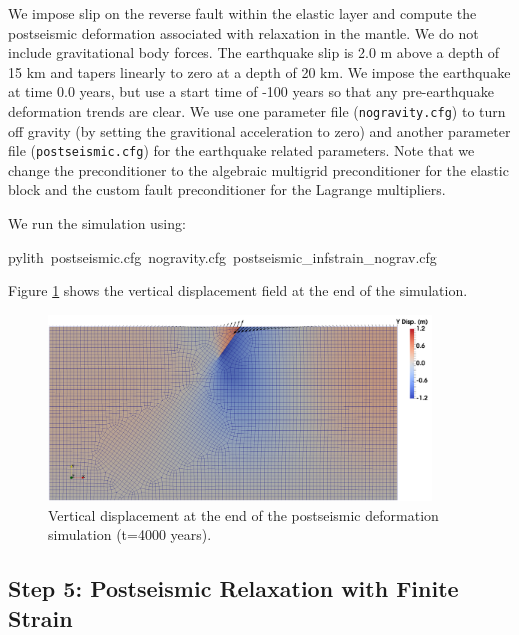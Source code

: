 We impose slip on the reverse fault within the elastic layer and compute
the postseismic deformation associated with relaxation in the mantle.
We do not include gravitational body forces. The earthquake slip is
2.0 m above a depth of 15 km and tapers linearly to zero at a depth
of 20 km. We impose the earthquake at time 0.0 years, but use a start
time of -100 years so that any pre-earthquake deformation trends are
clear. We use one parameter file (\texttt{nogravity.cfg}) to turn
off gravity (by setting the gravitional acceleration to zero) and
another parameter file (\texttt{postseismic.cfg}) for the earthquake
related parameters. Note that we change the preconditioner to the
algebraic multigrid preconditioner for the elastic block and the custom
fault preconditioner for the Lagrange multipliers. 

We run the simulation using:
\begin{lyxcode}
pylith~postseismic.cfg~nogravity.cfg~postseismic\_infstrain\_nograv.cfg
\end{lyxcode}
Figure \ref{fig:examples:gravity:2d:postseismc:infstrain:disp} shows
the vertical displacement field at the end of the simulation.

\begin{figure}
\begin{centering}
\includegraphics[width=4in]{tutorials/grav2d/figs/postseismic_infstrain_nograv-disp}
\par\end{centering}

\caption{Vertical displacement at the end of the postseismic deformation simulation
(t=4000 years).\label{fig:examples:gravity:2d:postseismc:infstrain:disp}}
\end{figure}



\subsection{Step 5: Postseismic Relaxation with Finite Strain}

